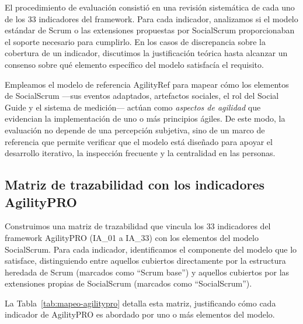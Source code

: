 El procedimiento de evaluación consistió en una revisión sistemática de cada uno de los 33 indicadores del framework. Para cada indicador, analizamos si el modelo estándar de Scrum o las extensiones propuestas por SocialScrum proporcionaban el soporte necesario para cumplirlo. En los casos de discrepancia sobre la cobertura de un indicador, discutimos la justificación teórica hasta alcanzar un consenso sobre qué elemento específico del modelo satisfacía el requisito.

Empleamos el modelo de referencia AgilityRef para mapear cómo los elementos de SocialScrum ---sus eventos adaptados, artefactos sociales, el rol del Social Guide y el sistema de medición--- actúan como \textit{aspectos de agilidad} que evidencian la implementación de uno o más principios ágiles. De este modo, la evaluación no depende de una percepción subjetiva, sino de un marco de referencia que permite verificar que el modelo está diseñado para apoyar el desarrollo iterativo, la inspección frecuente y la centralidad en las personas.

\subsection{Matriz de trazabilidad con los indicadores AgilityPRO}

Construimos una matriz de trazabilidad que vincula los 33 indicadores del framework AgilityPRO (IA\_01 a IA\_33) con los elementos del modelo SocialScrum. Para cada indicador, identificamos el componente del modelo que lo satisface, distinguiendo entre aquellos cubiertos directamente por la estructura heredada de Scrum (marcados como ``Scrum base'') y aquellos cubiertos por las extensiones propias de SocialScrum (marcados como ``SocialScrum'').

La Tabla~\ref{tab:mapeo-agilitypro} detalla esta matriz, justificando cómo cada indicador de AgilityPRO es abordado por uno o más elementos del modelo.

\begingroup
\scriptsize %
\renewcommand{\arraystretch}{1.4} %
\setlength{\tabcolsep}{4pt}
\setlength{\LTleft}{0pt}
\setlength{\LTright}{0pt}

